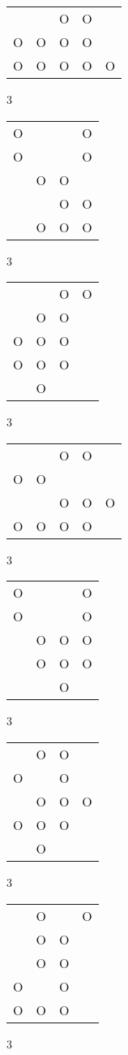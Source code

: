 \begin{tabular}{|m{0.2cm}m{0.2cm}m{0.2cm}m{0.2cm}m{0.2cm}|}\hline
 & &O&O& \\
O&O&O&O& \\
O&O&O&O&O\\
\hline\end{tabular}3
\begin{tabular}{|m{0.2cm}m{0.2cm}m{0.2cm}m{0.2cm}|}\hline
O& & &O\\
O& & &O\\
 &O&O& \\
 & &O&O\\
 &O&O&O\\
\hline\end{tabular}3
\begin{tabular}{|m{0.2cm}m{0.2cm}m{0.2cm}m{0.2cm}|}\hline
 & &O&O\\
 &O&O& \\
O&O&O& \\
O&O&O& \\
 &O& & \\
\hline\end{tabular}3
\begin{tabular}{|m{0.2cm}m{0.2cm}m{0.2cm}m{0.2cm}m{0.2cm}|}\hline
 & &O&O& \\
O&O& & & \\
 & &O&O&O\\
O&O&O&O& \\
\hline\end{tabular}3
\begin{tabular}{|m{0.2cm}m{0.2cm}m{0.2cm}m{0.2cm}|}\hline
O& & &O\\
O& & &O\\
 &O&O&O\\
 &O&O&O\\
 & &O& \\
\hline\end{tabular}3
\begin{tabular}{|m{0.2cm}m{0.2cm}m{0.2cm}m{0.2cm}|}\hline
 &O&O& \\
O& &O& \\
 &O&O&O\\
O&O&O& \\
 &O& & \\
\hline\end{tabular}3
\begin{tabular}{|m{0.2cm}m{0.2cm}m{0.2cm}m{0.2cm}|}\hline
 &O& &O\\
 &O&O& \\
 &O&O& \\
O& &O& \\
O&O&O& \\
\hline\end{tabular}3
